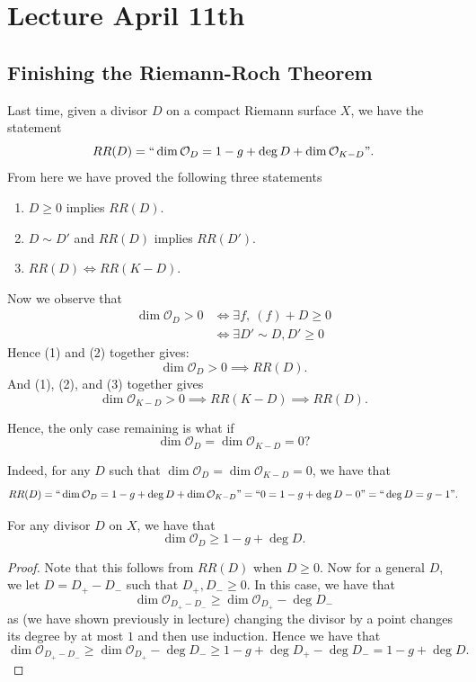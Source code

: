 \documentclass{article}
\begin{document}
{\newpage
\section{Lecture April 11th}

\subsection{Finishing the Riemann-Roch Theorem}

Last time, given a divisor $D$ on a compact Riemann surface $X$, we have the statement
\[RR(D) = ``\dim \mathcal{O}_D = 1 - g + \deg D + \dim \mathcal{O}_{K-D}".\]
From here we have proved the following three statements
\begin{enumerate}
    \item $D \geq 0$ implies $RR(D)$.
    \item $D \sim D'$ and $RR(D)$ implies $RR(D')$.
    \item $RR(D) \iff RR(K-D)$.
\end{enumerate}

Now we observe that
\begin{align*}
    \dim \mathcal{O}_D > 0 &\iff \exists f,\ (f) + D \geq 0\\
    &\iff \exists D' \sim D, D' \geq 0 \tag*{Here $\sim$ means linear equivalence}
\end{align*}
Hence (1) and (2) together gives:
\[\dim \mathcal{O}_D > 0 \implies RR(D).\]
And (1), (2), and (3) together gives
\[\dim \mathcal{O}_{K-D} > 0 \implies RR(K-D) \implies RR(D). \]

Hence, the only case remaining is what if
\[\dim \mathcal{O}_D = \dim \mathcal{O}_{K-D} = 0?\]

Indeed, for any $D$ such that $\dim \mathcal{O}_D = \dim \mathcal{O}_{K-D} = 0$, we have that
\[RR(D) = ``\dim \mathcal{O}_D = 1 - g + \deg D + \dim \mathcal{O}_{K-D}" = ``0 = 1- g + \deg D - 0" = ``\deg D = g - 1".\]

\begin{theorem}
    For any divisor $D$ on $X$, we have that
    \[\dim \mathcal{O}_D \geq 1 - g + \deg D.\]
\end{theorem}

\begin{proof}
    Note that this follows from $RR(D)$ when $D \geq 0$. Now for a general $D$, we let $D = D_+ - D_-$ such that $D_+, D_- \geq 0$. In this case, we have that
    \[\dim \mathcal{O}_{D_+ - D_-} \geq \dim \mathcal{O}_{D_+} - \deg D_-\]
    as (we have shown previously in lecture) changing the divisor by a point changes its degree by at most $1$ and then use induction. Hence we have that
    \[\dim \mathcal{O}_{D_+ - D_-} \geq \dim \mathcal{O}_{D_+} - \deg D_- \geq 1 - g + \deg D_+ - \deg D_- = 1 - g + \deg D.\]
\end{proof}

}
\end{document}
